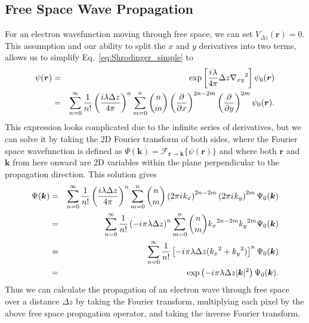 \documentclass[%
 superscriptaddress,
 aip,
 amsmath,amssymb,
preprint,%
 author-year,%
longbibliography
]{revtex4-2}
\newcommand{\ii}{{i\mkern1mu}}
\newcommand{\FFT}{\mathcal{F}_{\mathbf{r}\to\mathbf{k}}}
\begin{document}
\subsection*{Free Space Wave Propagation}

For an electron wavefunction moving through free space, we can set $ V_{\Delta z}(\bm{r}) = 0$. This assumption and our ability to split the $x$ and $y$ derivatives into two terms, allows us to simplify Eq.~\ref{eq:Shrodinger_simple} to 
\begin{eqnarray}
    \psi(\bm{r})
    &=& 
    \exp\left[
        \frac{\ii \lambda}{4 \pi} \Delta z {\nabla_{xy}}^2
    \right]
    \psi_0(\bm{r}) 
    \nonumber \\
    &=& 
    \sum_{n=0}^\infty
    \frac{1}{n!}
    \left(
        \frac{i \lambda \Delta z}{4 \pi}
    \right)^n
    \sum_{m=0}^n
    {n \choose m}
    \left(
        \frac{\partial}{\partial x}
    \right)^{2n-2m}
    \left(
        \frac{\partial}{\partial y}
    \right)^{2m}
    \psi_0(\bm{r}).
\end{eqnarray}
This expression looks complicated due to the infinite series of derivatives, but we can solve it by taking the 2D Fourier transform of both sides, where the Fourier space wavefunction is defined as $\Psi(\bm{k}) = \FFT\{\psi(\bm{r})\}$ and where both $\bm{r}$ and $\bm{k}$ from here onward are 2D variables within the plane perpendicular to the propagation direction. This solution gives
\begin{eqnarray}
    \Psi(\bm{k})
    &=&
    \sum_{n=0}^\infty
    \frac{1}{n!}
    \left(
        \frac{i \lambda \Delta z}{4 \pi}
    \right)^n
    \sum_{m=0}^n
    {n \choose m}
    \left(
        2 \pi \ii k_x
    \right)^{2n-2m}
    \left(
        2 \pi \ii k_y
    \right)^{2m}
    \Psi_0(\bm{k})
    \nonumber \\
    &=&
    \sum_{n=0}^\infty
    \frac{1}{n!}
    \left(
        - \ii \pi \lambda \Delta z
    \right)^n
    \sum_{m=0}^n
    {n \choose m}
    {k_x}^{2n-2m}
    {k_y}^{2m}
    \Psi_0(\bm{k})
    \nonumber \\
    &=&
    \sum_{n=0}^\infty
    \frac{1}{n!}
    \left[
        - \ii \pi \lambda \Delta z
        ({k_x}^2 + {k_y}^2)
    \right]^n
    \Psi_0(\bm{k})
    \nonumber \\
    &=& \exp\left(
        - \ii \pi \lambda  \Delta z |\bm{k}|^2
    \right)
    \Psi_0(\bm{k}).
\end{eqnarray}
Thus we can calculate the propagation of an electron wave through free space over a distance $\Delta z$ by taking the Fourier transform, multiplying each pixel by the above free space propagation operator, and taking the inverse Fourier transform.
\end{document}
